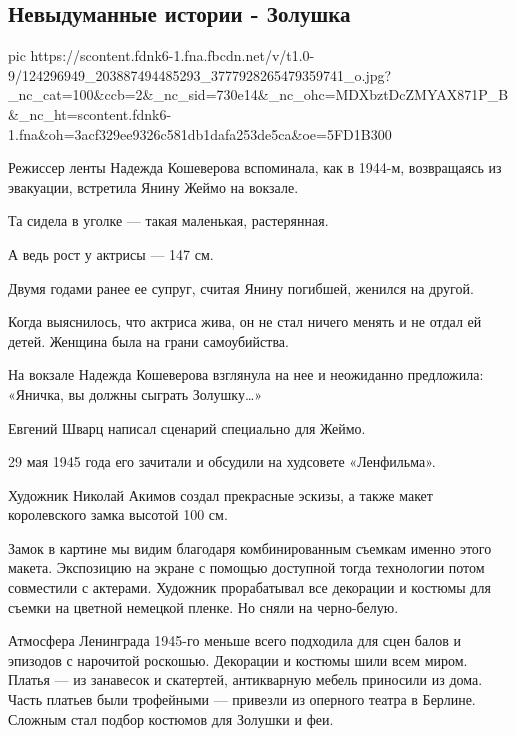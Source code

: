  
 
 

\subsection{Невыдуманные истории - Золушка}


\ifcmt
pic https://scontent.fdnk6-1.fna.fbcdn.net/v/t1.0-9/124296949_203887494485293_3777928265479359741_o.jpg?_nc_cat=100&ccb=2&_nc_sid=730e14&_nc_ohc=MDXbztDcZMYAX871P_B&_nc_ht=scontent.fdnk6-1.fna&oh=3acf329ee9326c581db1dafa253de5ca&oe=5FD1B300
\fi

Режиссер ленты Надежда Кошеверова вспоминала, как в 1944-м, возвращаясь из
эвакуации, встретила Янину Жеймо на вокзале.

Та сидела в уголке — такая маленькая, растерянная.

А ведь рост у актрисы — 147 см.

Двумя годами ранее ее супруг, считая Янину погибшей, женился на другой.

Когда выяснилось, что актриса жива, он не стал ничего менять и не отдал ей
детей.  Женщина была на грани самоубийства.

На вокзале Надежда Кошеверова взглянула на нее и неожиданно предложила:
«Яничка, вы должны сыграть Золушку…»

Евгений Шварц написал сценарий специально для Жеймо.

29 мая 1945 года его зачитали и обсудили на худсовете «Ленфильма».

Художник Николай Акимов создал прекрасные эскизы, а также макет королевского
замка высотой 100 см.

Замок в картине мы видим благодаря комбинированным съемкам именно этого макета.
Экспозицию на экране с помощью доступной тогда технологии потом совместили с
актерами. Художник прорабатывал все декорации и костюмы для съемки на цветной
немецкой пленке. Но сняли на черно-белую.

Атмосфера Ленинграда 1945-го меньше всего подходила для сцен балов и эпизодов с
нарочитой роскошью. Декорации и костюмы шили всем миром. Платья — из занавесок
и скатертей, антикварную мебель приносили из дома. Часть платьев были
трофейными — привезли из оперного театра в Берлине. Сложным стал подбор
костюмов для Золушки и феи.

